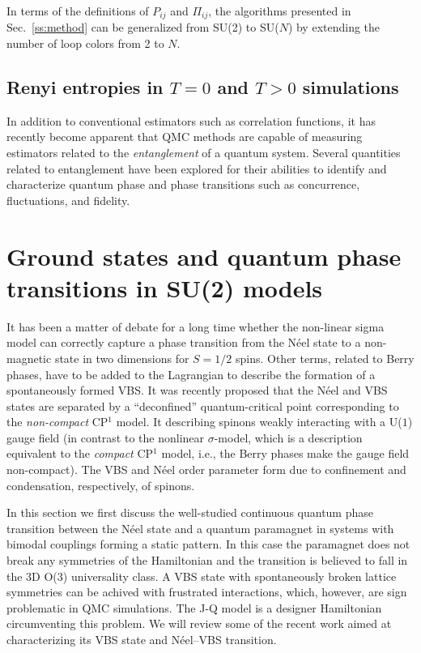 \documentclass[range]{ar2e}
\begin{document}
In terms of the definitions of $P_{ij}$ and $\Pi_{ij}$, the algorithms presented in
Sec.~\ref{ss:method} can be generalized from SU(2) to SU($N$) by
extending the number of loop colors from 2 to $N$.


\subsection{Renyi entropies in $T=0$ and $T>0$ simulations} 
\label{ss:renyi}


In addition to conventional estimators such as correlation functions, it has recently become apparent that QMC methods are capable of measuring estimators related to the {\it entanglement} of a quantum system.  Several quantities related to entanglement have been explored for their abilities to identify and characterize quantum phase and phase transitions such as concurrence, fluctuations, and fidelity.  

\section{Ground states and quantum phase transitions in SU(2) models}
\label{sec:su2models}

It has been a matter of debate for a long time whether the non-linear sigma model can correctly capture a phase transition from the N\'eel state 
to a non-magnetic state in two dimensions for $S=1/2$ spins. Other terms, related to Berry phases, have to be added to the Lagrangian to describe the 
formation of a spontaneously formed VBS. It was recently proposed that the N\'eel and VBS states are separated by a ``deconfined'' quantum-critical 
point \cite{Senthil04a} corresponding to the {\it non-compact} CP$^1$ model. It  describing spinons weakly interacting with a U($1$) gauge field (in contrast 
to the nonlinear $\sigma$-model, which is a description equivalent to the {\it compact} CP$^1$ model, i.e., the Berry phases make the gauge field non-compact). 
The VBS and N\'eel order parameter form due to confinement and condensation, respectively, of spinons. 

In this section we first discuss the well-studied continuous quantum phase transition between the N\'eel state and a quantum paramagnet in systems 
with bimodal couplings forming a static pattern. In this case the paramagnet does not break any symmetries of the Hamiltonian and the transition 
is believed to fall in the 3D O($3$) universality class. A VBS state with spontaneously broken lattice symmetries can be achived with frustrated 
interactions, which, however, are sign problematic in QMC simulations. The J-Q model \cite{Sandvik07} is a designer Hamiltonian circumventing this 
problem. We will review some of the recent work aimed at characterizing its VBS state and  N\'eel--VBS transition.
\end{document}
